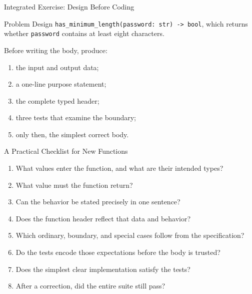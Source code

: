 \documentclass[aspectratio=169,10pt]{beamer}
\begin{document}
\begin{frame}[shrink=4]{Integrated Exercise: Design Before Coding}
  \begin{block}{Problem}
    Design \texttt{has\_minimum\_length(password: str) -> bool}, which returns whether \texttt{password} contains at least eight characters.
  \end{block}

  \begin{activity}
    Before writing the body, produce:
    \begin{enumerate}
      \item the input and output data;
      \item a one-line purpose statement;
      \item the complete typed header;
      \item three tests that examine the boundary;
      \item only then, the simplest correct body.
    \end{enumerate}
  \end{activity}
\end{frame}

\begin{frame}{A Practical Checklist for New Functions}
  \begin{enumerate}
    \item What values enter the function, and what are their intended types?
    \item What value must the function return?
    \item Can the behavior be stated precisely in one sentence?
    \item Does the function header reflect that data and behavior?
    \item Which ordinary, boundary, and special cases follow from the specification?
    \item Do the tests encode those expectations before the body is trusted?
    \item Does the simplest clear implementation satisfy the tests?
    \item After a correction, did the entire suite still pass?
  \end{enumerate}
\end{frame}
\end{document}
